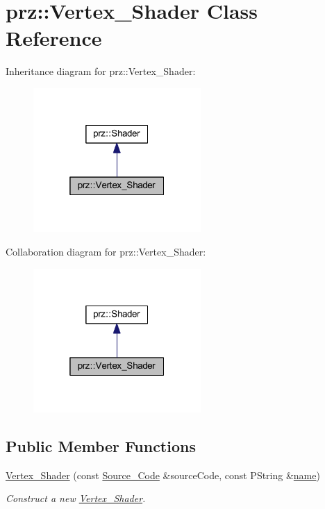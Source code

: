 \hypertarget{classprz_1_1_vertex___shader}{}\section{prz\+::Vertex\+\_\+\+Shader Class Reference}
\label{classprz_1_1_vertex___shader}


Inheritance diagram for prz\+::Vertex\+\_\+\+Shader\+:
\nopagebreak
\begin{figure}[H]
\begin{center}
\leavevmode
\includegraphics[width=181pt]{classprz_1_1_vertex___shader__inherit__graph}
\end{center}
\end{figure}


Collaboration diagram for prz\+::Vertex\+\_\+\+Shader\+:
\nopagebreak
\begin{figure}[H]
\begin{center}
\leavevmode
\includegraphics[width=181pt]{classprz_1_1_vertex___shader__coll__graph}
\end{center}
\end{figure}
\subsection*{Public Member Functions}
\begin{DoxyCompactItemize}
\item 
\mbox{\hyperlink{classprz_1_1_vertex___shader_a9f8a41c693e6ce7088bc831c10e8005e}{Vertex\+\_\+\+Shader}} (const \mbox{\hyperlink{classprz_1_1_source___code}{Source\+\_\+\+Code}} \&source\+Code, const P\+String \&\mbox{\hyperlink{classprz_1_1_shader_a2ba459fe4dc556e94ab73df91d2c0a4e}{name}})
\begin{DoxyCompactList}\small\item\em Construct a new \mbox{\hyperlink{classprz_1_1_vertex___shader}{Vertex\+\_\+\+Shader}}. \end{DoxyCompactList}\end{DoxyCompactItemize}
